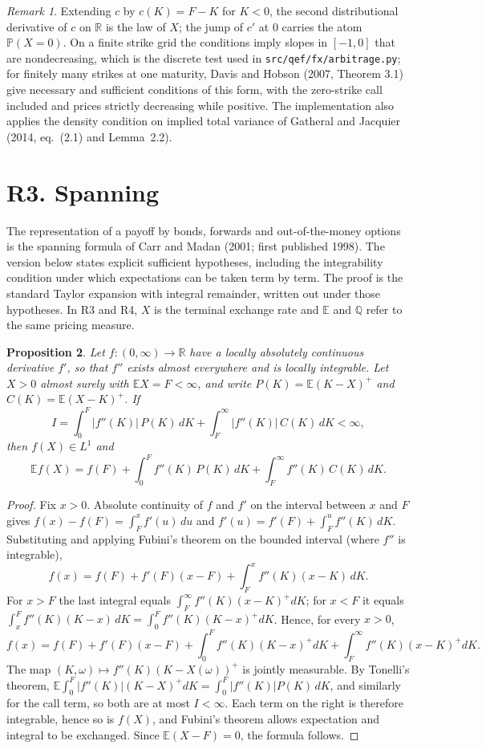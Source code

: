 \documentclass[11pt]{article}
\newtheorem{proposition}{Proposition}
\theoremstyle{remark}
\newtheorem{remark}[proposition]{Remark}
\newcommand{\E}{\mathbb{E}}
\newcommand{\Q}{\mathbb{Q}}
\renewcommand{\P}{\mathbb{P}}
\begin{document}
\begin{remark}
Extending $c$ by $c(K)=F-K$ for $K<0$, the second distributional derivative of $c$ on $\mathbb{R}$ is the law of $X$; the jump of $c'$ at $0$ carries the atom $\P(X=0)$. On a finite strike grid the conditions imply slopes in $[-1,0]$ that are nondecreasing, which is the discrete test used in \texttt{src/qef/fx/arbitrage.py}; for finitely many strikes at one maturity, Davis and Hobson (2007, Theorem 3.1) give necessary and sufficient conditions of this form, with the zero-strike call included and prices strictly decreasing while positive. The implementation also applies the density condition on implied total variance of Gatheral and Jacquier (2014, eq.~(2.1) and Lemma~2.2).
\end{remark}

\section*{R3. Spanning}

The representation of a payoff by bonds, forwards and out-of-the-money options is the spanning formula of Carr and Madan (2001; first published 1998). The version below states explicit sufficient hypotheses, including the integrability condition under which expectations can be taken term by term. The proof is the standard Taylor expansion with integral remainder, written out under those hypotheses. In R3 and R4, $X$ is the terminal exchange rate and $\E$ and $\Q$ refer to the same pricing measure.

\begin{proposition}
Let $f:(0,\infty)\to\mathbb{R}$ have a locally absolutely continuous derivative $f'$, so that $f''$ exists almost everywhere and is locally integrable. Let $X>0$ almost surely with $\E X=F<\infty$, and write $P(K)=\E(K-X)^+$ and $C(K)=\E(X-K)^+$. If
\[
I=\int_0^F|f''(K)|\,P(K)\,dK+\int_F^\infty|f''(K)|\,C(K)\,dK<\infty,
\]
then $f(X)\in L^1$ and
\[
\E f(X)=f(F)+\int_0^F f''(K)\,P(K)\,dK+\int_F^\infty f''(K)\,C(K)\,dK.
\]
\end{proposition}

\begin{proof}
Fix $x>0$. Absolute continuity of $f$ and $f'$ on the interval between $x$ and $F$ gives $f(x)-f(F)=\int_F^x f'(u)\,du$ and $f'(u)=f'(F)+\int_F^u f''(K)\,dK$. Substituting and applying Fubini's theorem on the bounded interval (where $f''$ is integrable),
\[
f(x)=f(F)+f'(F)(x-F)+\int_F^x f''(K)(x-K)\,dK.
\]
For $x>F$ the last integral equals $\int_F^\infty f''(K)(x-K)^+dK$; for $x<F$ it equals $\int_x^F f''(K)(K-x)\,dK=\int_0^F f''(K)(K-x)^+dK$. Hence, for every $x>0$,
\[
f(x)=f(F)+f'(F)(x-F)+\int_0^F f''(K)(K-x)^+dK+\int_F^\infty f''(K)(x-K)^+dK.
\]
The map $(K,\omega)\mapsto f''(K)(K-X(\omega))^+$ is jointly measurable. By Tonelli's theorem, $\E\int_0^F|f''(K)|(K-X)^+dK=\int_0^F|f''(K)|P(K)\,dK$, and similarly for the call term, so both are at most $I<\infty$. Each term on the right is therefore integrable, hence so is $f(X)$, and Fubini's theorem allows expectation and integral to be exchanged. Since $\E(X-F)=0$, the formula follows.
\end{proof}
\end{document}
